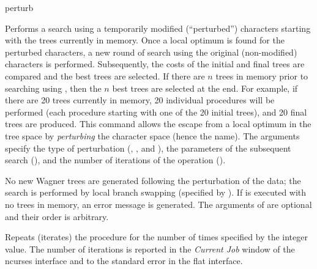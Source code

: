 	 
\begin{command}{perturb}{}


	\begin{poydescription} 
        Performs a search using a temporarily modified (``perturbed'') characters
        starting with the trees currently in memory. Once a local optimum is found for 
        the perturbed characters,
        a new round of search using the original (non-modified) characters is
        performed. Subsequently, the costs of the initial and final trees are
        compared and the best trees are selected. If there are $n$ trees in
        memory prior to searching using , then the  $n$ best
        trees are selected at the end. For example, if there are 20 trees currently in memory,
        20 individual  procedures will be performed (each
        procedure starting with one of the 20 initial trees), and 20
        final trees are produced.        
        This command allows the escape from a local optimum in the tree space by
        \emph{perturbing} the character space (hence the name). The
        arguments specify the type of perturbation (,
        , and ), the parameters of the
        subsequent search (), and the number of iterations 
        of the  operation ().
        
        No new Wagner trees are generated following the perturbation of the
        data; the search is performed by local branch swapping (specified by
        ). If  is executed with no
        trees in memory, an error message is generated. The arguments of
         are optional and their order is arbitrary. 
 	\end{poydescription}

	\begin{arguments}

            {Repeats (iterates) the  procedure for the
            number of times specified by the integer value. The number of iterations
            is reported in the \emph{Current Job} window of the ncurses interface
            and to the standard error in the flat interface.}
            {}


\end{arguments}
\end{command}
